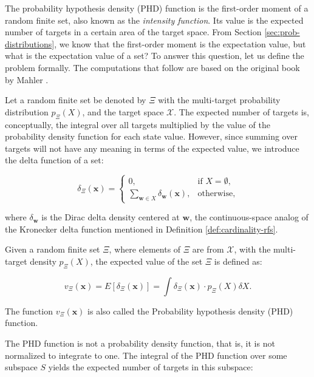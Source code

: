 The probability hypothesis density (PHD) function is the first-order moment of a random finite set, also known as the \textit{intensity function}. Its value is the expected number of targets in a certain area of the target space. From Section \ref{sec:prob-distributions}, we know that the first-order moment is the expectation value, but what is the expectation value of a set? To answer this question, let us define the problem formally. The computations that follow are based on the original book by Mahler \cite[576--578]{mahlerStatisticalMultisourcemultitargetInformation2007}.

Let a random finite set be denoted by $\Xi$ with the multi-target probability distribution $p_\Xi(X)$, and the target space $\mathcal{X}$. The expected number of targets is, conceptually, the integral over all targets multiplied by the value of the probability density function for each state value. However, since summing over targets will not have any meaning in terms of the expected value, we introduce the delta function of a set:

\begin{equation}
    \delta_\Xi(\mathbf{x}) = \begin{cases}
        0, & \text{if } X = \emptyset, \\
        \sum_{\mathbf{w} \in X} \delta_\mathbf{w}(\mathbf{x}), & \text{otherwise},
    \end{cases}
\end{equation}

\noindent where $\delta_\mathbf{w}$ is the Dirac delta density centered at $\mathbf{w}$, the continuous-space analog of the Kronecker delta function mentioned in Definition \ref{def:cardinality-rfs}.

\begin{definition}\label{def:phd-function}
    Given a random finite set $\Xi$, where elements of $\Xi$ are from $\mathcal{X}$, with the multi-target density $p_\Xi(X)$, the expected value of the set $\Xi$ is defined as:

    \begin{equation}
        v_\Xi(\mathbf{x}) = E[\delta_\Xi(\mathbf{x})] = \int \delta_\Xi(\mathbf{x}) \cdot p_\Xi(X) \delta X.
    \end{equation}

    The function $v_\Xi(\mathbf{x})$ is also called the Probability hypothesis density (PHD) function.
\end{definition}

The PHD function is not a probability density function, that is, it is not normalized to integrate to one. The integral of the PHD function over some subspace $S$ yields the expected number of targets in this subspace:

